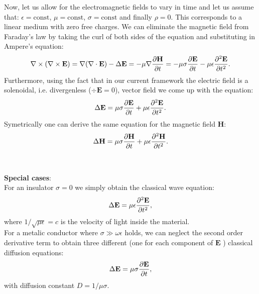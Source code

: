 Now, let us allow for the electromagnetic fields to vary in time and let us assume that: $\epsilon = \text{const}$, $\mu = \text{const}$, $\sigma = \text{const}$ and finally $\rho = 0$. This corresponds to a linear
medium with zero free charges. We can eliminate the magnetic field from Faraday's law by taking the curl of both sides of the equation and substituting in Ampere's equation:
\begin{equation*}
  \mathbf{\nabla}\times (\mathbf{\nabla}\times \mathbf{E}) = \mathbf{\nabla}(\mathbf{\nabla}\cdot \mathbf{E})-\Delta \mathbf{E} = -\mu \mathbf{\nabla} \frac{\partial \mathbf{H}}{\partial t} = -\mu\sigma\frac{\partial \mathbf{E}}{\partial t}-\mu\epsilon \frac{\partial^2 \mathbf{E}}{\partial t^2}.
\end{equation*} 
Furthermore, using the fact that in our current framework the electric field is a solenoidal, i.e. divergenless ($\div \bm{E} = 0 $), vector field we come up with the equation: 
\begin{equation}
  \label{eq:electricwavebase}
  \Delta\mathbf{E} =  \mu\sigma\frac{\partial \mathbf{E}}{\partial t}+\mu\epsilon \frac{\partial^2 \mathbf{E}}{\partial t^2}.
\end{equation}
Symetrically one can derive the same equation for the magnetic field $\bm{H}$:
\begin{equation}
  \label{eq:magneticwavebase}
  \Delta\mathbf{H} =  \mu\sigma\frac{\partial \mathbf{H}}{\partial t}+\mu\epsilon \frac{\partial^2 \mathbf{H}}{\partial t^2}.
\end{equation}
\\\\
\textbf{Special cases}:\\

For an insulator $\sigma = 0$ we simply obtain the classical wave equation:
\begin{equation*}
  \Delta \mathbf{E} = \mu\epsilon \frac{\partial^2 \mathbf{E}}{\partial t^2},
\end{equation*}
where $1/\sqrt{\mu\epsilon} = c$ is the velocity of light inside the material. \\

For a metalic conductor where $\sigma \gg \omega \epsilon$ holds, we can neglect the second order derivative term to obtain three different (one for each component of $\bm{E}$ ) classical diffusion equations:
\begin{equation}
  \Delta \mathbf{E} = \mu\sigma \frac{\partial \mathbf{E}}{\partial t},
\end{equation}
with diffusion constant $D = 1/\mu\sigma$. 

